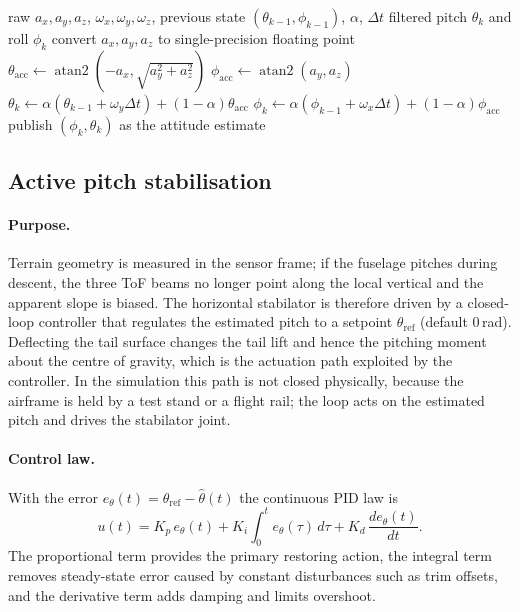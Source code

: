 \documentclass[11pt,a4paper]{article}
\begin{document}
\begin{algorithm}[ht]
\caption{Complementary filter update (executed at 100\,Hz)}\label{alg:cf}
\begin{algorithmic}[1]
\Require raw $a_x,a_y,a_z$, $\omega_x,\omega_y,\omega_z$, previous state $(\theta_{k-1},\phi_{k-1})$, $\alpha$, $\Delta t$
\Ensure filtered pitch $\theta_k$ and roll $\phi_k$
\State convert $a_x,a_y,a_z$ to single-precision floating point
\State $\theta_{\mathrm{acc}}\gets\operatorname{atan2}(-a_x,\sqrt{a_y^2+a_z^2})$
\State $\phi_{\mathrm{acc}}\gets\operatorname{atan2}(a_y,a_z)$
\State $\theta_k\gets\alpha(\theta_{k-1}+\omega_y\Delta t)+(1-\alpha)\theta_{\mathrm{acc}}$
\State $\phi_k\gets\alpha(\phi_{k-1}+\omega_x\Delta t)+(1-\alpha)\phi_{\mathrm{acc}}$
\State publish $(\phi_k,\theta_k)$ as the attitude estimate
\end{algorithmic}
\end{algorithm}
 
\subsection{Active pitch stabilisation}\label{sec:pid}
\paragraph{Purpose.} Terrain geometry is measured in the sensor frame; if the fuselage pitches during descent, the three ToF beams no longer point along the local vertical and the apparent slope is biased. The horizontal stabilator is therefore driven by a closed-loop controller that regulates the estimated pitch to a setpoint $\theta_{\mathrm{ref}}$ (default $0$\,rad). Deflecting the tail surface changes the tail lift and hence the pitching moment about the centre of gravity, which is the actuation path exploited by the controller. In the simulation this path is not closed physically, because the airframe is held by a test stand or a flight rail; the loop acts on the estimated pitch and drives the stabilator joint.
 
\paragraph{Control law.} With the error $e_\theta(t)=\theta_{\mathrm{ref}}-\hat\theta(t)$ the continuous PID law is
\begin{equation}
u(t)=K_p\,e_\theta(t)+K_i\!\int_0^t e_\theta(\tau)\,d\tau+K_d\,\frac{de_\theta(t)}{dt}.
\end{equation}
The proportional term provides the primary restoring action, the integral term removes steady-state error caused by constant disturbances such as trim offsets, and the derivative term adds damping and limits overshoot.
 
\end{document}
